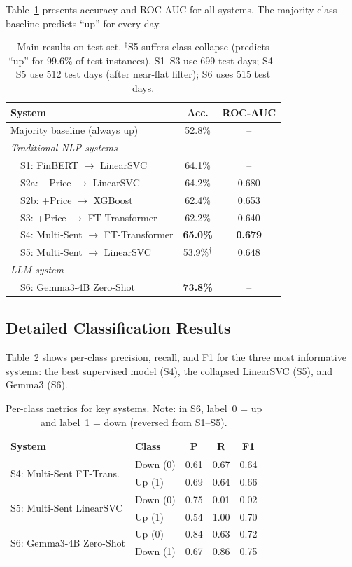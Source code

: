 \documentclass[11pt]{article}
\begin{document}
Table~\ref{tab:main} presents accuracy and ROC-AUC for all systems. The majority-class baseline predicts ``up'' for every day.

\begin{table}[t]
\centering
\small
\begin{tabular}{lcc}
\toprule
\textbf{System} & \textbf{Acc.} & \textbf{ROC-AUC} \\
\midrule
Majority baseline (always up) & 52.8\% & -- \\
\midrule
\textit{Traditional NLP systems} & & \\
~~S1: FinBERT $\to$ LinearSVC & 64.1\% & -- \\
~~S2a: +Price $\to$ LinearSVC & 64.2\% & 0.680 \\
~~S2b: +Price $\to$ XGBoost & 62.4\% & 0.653 \\
~~S3: +Price $\to$ FT-Transformer & 62.2\% & 0.640 \\
~~S4: Multi-Sent $\to$ FT-Transformer & \textbf{65.0\%} & \textbf{0.679} \\
~~S5: Multi-Sent $\to$ LinearSVC & 53.9\%$^\dagger$ & 0.648 \\
\midrule
\textit{LLM system} & & \\
~~S6: Gemma3-4B Zero-Shot & \textbf{73.8\%} & -- \\
\bottomrule
\end{tabular}
\caption{Main results on test set. $^\dagger$S5 suffers class collapse (predicts ``up'' for 99.6\% of test instances). S1--S3 use 699 test days; S4--S5 use 512 test days (after near-flat filter); S6 uses 515 test days.}
\label{tab:main}
\end{table}

\subsection{Detailed Classification Results}

Table~\ref{tab:detail} shows per-class precision, recall, and F1 for the three most informative systems: the best supervised model (S4), the collapsed LinearSVC (S5), and Gemma3 (S6).

\begin{table}[t]
\centering
\small
\begin{tabular}{llccc}
\toprule
\textbf{System} & \textbf{Class} & \textbf{P} & \textbf{R} & \textbf{F1} \\
\midrule
\multirow{2}{*}{S4: Multi-Sent FT-Trans.} & Down (0) & 0.61 & 0.67 & 0.64 \\
 & Up (1) & 0.69 & 0.64 & 0.66 \\
\midrule
\multirow{2}{*}{S5: Multi-Sent LinearSVC} & Down (0) & 0.75 & 0.01 & 0.02 \\
 & Up (1) & 0.54 & 1.00 & 0.70 \\
\midrule
\multirow{2}{*}{S6: Gemma3-4B Zero-Shot} & Up (0) & 0.84 & 0.63 & 0.72 \\
 & Down (1) & 0.67 & 0.86 & 0.75 \\
\bottomrule
\end{tabular}
\caption{Per-class metrics for key systems. Note: in S6, label~0 = up and label~1 = down (reversed from S1--S5).}
\label{tab:detail}
\end{table}
\end{document}
